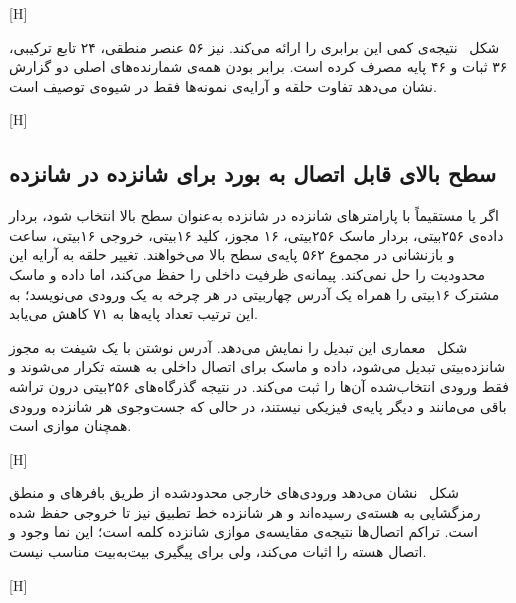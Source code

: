 [H]

شکل~ نتیجه‌ی کمی این برابری را ارائه می‌کند.
 نیز ۵۶ عنصر منطقی، ۲۴ تابع ترکیبی، ۳۶ ثبات و ۴۶ پایه مصرف کرده
است. برابر بودن همه‌ی شمارنده‌های اصلی دو گزارش نشان می‌دهد تفاوت حلقه و آرایه‌ی نمونه‌ها
فقط در شیوه‌ی توصیف  است.

[H]

\subsection{سطح بالای قابل اتصال به بورد برای شانزده در شانزده}

اگر  یا  مستقیماً با پارامترهای شانزده در شانزده به‌عنوان
سطح بالا انتخاب شود، بردار داده‌ی ۲۵۶‌بیتی، بردار ماسک ۲۵۶‌بیتی، ۱۶ مجوز، کلید ۱۶‌بیتی،
خروجی ۱۶‌بیتی، ساعت و بازنشانی در مجموع ۵۶۲ پایه‌ی سطح بالا می‌خواهند. تغییر حلقه به آرایه
این محدودیت را حل نمی‌کند. پیمانه‌ی  ظرفیت داخلی را حفظ می‌کند،
اما داده و ماسک مشترک ۱۶‌بیتی را همراه یک آدرس چهار‌بیتی در هر چرخه به یک ورودی می‌نویسد؛
به این ترتیب تعداد پایه‌ها به ۷۱ کاهش می‌یابد.

شکل~ معماری این تبدیل را نمایش می‌دهد. آدرس نوشتن با
یک شیفت به مجوز  شانزده‌بیتی تبدیل می‌شود، داده و ماسک برای اتصال داخلی
به هسته تکرار می‌شوند و فقط ورودی انتخاب‌شده آن‌ها را ثبت می‌کند. در نتیجه گذرگاه‌های
۲۵۶‌بیتی درون تراشه باقی می‌مانند و دیگر پایه‌ی فیزیکی نیستند، در حالی که جست‌وجوی هر
شانزده ورودی همچنان موازی است.

[H]

شکل~ نشان می‌دهد ورودی‌های خارجی محدودشده از طریق
بافرهای  و منطق رمزگشایی به هسته‌ی  رسیده‌اند و هر شانزده خط تطبیق
نیز تا خروجی حفظ شده است. تراکم اتصال‌ها نتیجه‌ی مقایسه‌ی موازی شانزده کلمه است؛ این نما
وجود و اتصال هسته را اثبات می‌کند، ولی برای پیگیری بیت‌به‌بیت مناسب نیست.

[H]

